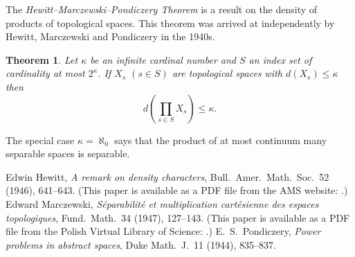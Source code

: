 \documentclass[12pt]{article}
\newtheorem*{thm*}{Theorem}
\begin{document}

The \emph{Hewitt--Marczewski--Pondiczery Theorem}
is a result on the density of products of topological spaces.
This theorem was arrived at independently by 
Hewitt\cite{hewitt}, Marczewski\cite{marcz} and Pondiczery\cite{pond}
in the 1940s.

\begin{thm*}
Let $\kappa$ be an infinite cardinal number and $S$ an index set
of cardinality at most $2^\kappa$.
If $X_s$ $(s\in S)$ are topological spaces with $d(X_s)\le\kappa$ then
\[
  d\left(\prod_{s\in S}X_s\right)\le\kappa.
\]
\end{thm*}

The special case $\kappa=\aleph_0$
says that the product of at most continuum many separable spaces is separable.

\begin{thebibliography}{3}
 Edwin Hewitt,
 {\it A remark on density characters},
 Bull.\ Amer.\ Math.\ Soc.\ 52 (1946), 641--643.
 (This paper is available as a PDF file from the AMS website:
  .)
 Edward Marczewski,
 {\it S\'eparabilit\'e et multiplication cart\'esienne des espaces topologiques},
 Fund.\ Math.\ 34 (1947), 127--143.
 (This paper is available as a PDF file from the Polish Virtual Library of Science:
  .)
 E.\ S.\ Pondiczery,
 {\it Power problems in abstract spaces},
 Duke Math.\ J.\ 11 (1944), 835--837.
\end{thebibliography}
\end{document}

